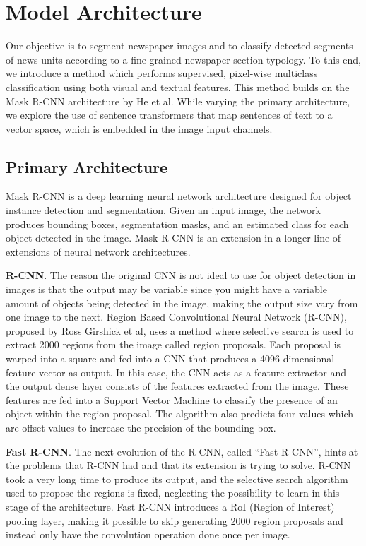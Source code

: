 \documentclass[english, bibtex]{kththesis}
\begin{document}
\chapter{Model Architecture}
\label{ch:modelarch}

Our objective is to segment newspaper images and to classify detected segments of news units according to a fine-grained newspaper section typology. To this end, we introduce a method which performs supervised, pixel-wise multiclass classification using both visual and textual features. This method builds on the Mask R-CNN architecture by He et al\cite{DBLP:journals/corr/HeGDG17}. While varying the primary architecture, we explore the use of sentence transformers that map sentences of text to a vector space, which is embedded in the image input channels.

\section{Primary Architecture}

Mask R-CNN is a deep learning neural network architecture designed for object instance detection and segmentation. Given an input image, the network produces bounding boxes, segmentation masks, and an estimated class for each object detected in the image. Mask R-CNN is an extension in a longer line of extensions of neural network architectures.

\textbf{R-CNN}. The reason the original CNN is not ideal to use for object detection in images is that the output may be variable since you might have a variable amount of objects being detected in the image, making the output size vary from one image to the next. Region Based Convolutional Neural Network (R-CNN), proposed by Ross Girshick et al\cite{Girshick_2014_CVPR}, uses a method where selective search is used to extract 2000 regions from the image called region proposals. Each proposal is warped into a square and fed into a CNN that produces a 4096-dimensional feature vector as output. In this case, the CNN acts as a feature extractor and the output dense layer consists of the features extracted from the image. These features are fed into a Support Vector Machine to classify the presence of an object within the region proposal. The algorithm also predicts four values which are offset values to increase the precision of the bounding box.  

\textbf{Fast R-CNN}. The next evolution of the R-CNN, called “Fast R-CNN”\cite{Girshick_2015_ICCV}, hints at the problems that R-CNN had and that its extension is trying to solve. R-CNN took a very long time to produce its output, and the selective search algorithm used to propose the regions is fixed, neglecting the possibility to learn in this stage of the architecture. Fast R-CNN introduces a RoI (Region of Interest) pooling layer, making it possible to skip generating 2000 region proposals and instead only have the convolution operation done once per image. 
\end{document}

